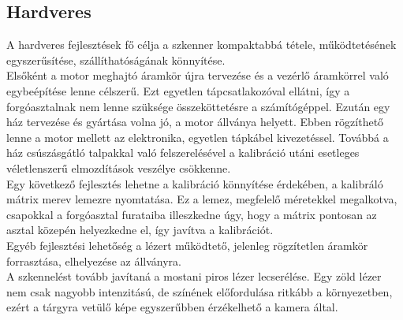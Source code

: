 \documentclass[12pt,a4paper]{article}
\begin{document}
\subsection{Hardveres}
A hardveres fejlesztések fő célja a szkenner kompaktabbá tétele, működtetésének egyszerűsítése, szállíthatóságának könnyítése.
\\[10pt]
Elsőként a motor meghajtó áramkör újra tervezése és a vezérlő áramkörrel való egybeépítése lenne célszerű. Ezt egyetlen tápcsatlakozóval ellátni, így a forgóasztalnak nem lenne szüksége összeköttetésre a számítógéppel.
Ezután egy ház tervezése és gyártása volna jó, a motor állványa helyett. Ebben rögzíthető lenne a motor mellett az elektronika, egyetlen tápkábel kivezetéssel. Továbbá a ház csúszásgátló talpakkal való felszerelésével a kalibráció utáni esetleges véletlenszerű elmozdítások veszélye csökkenne.
\\[10pt]
Egy következő fejlesztés lehetne a kalibráció könnyítése érdekében, a kalibráló mátrix merev lemezre nyomtatása. Ez a lemez, megfelelő méretekkel megalkotva, csapokkal a forgóasztal furataiba illeszkedne úgy, hogy a mátrix pontosan az asztal közepén helyezkedne el, így javítva a kalibrációt.
\\[10pt]
Egyéb fejlesztési lehetőség a lézert működtető, jelenleg rögzítetlen áramkör forrasztása, elhelyezése az állványra.
\\[10pt]
A szkennelést tovább javítaná a mostani piros lézer lecserélése. Egy zöld lézer nem csak nagyobb intenzitású, de színének előfordulása ritkább a környezetben, ezért a tárgyra vetülő képe egyszerűbben érzékelhető a kamera által.
\end{document}
